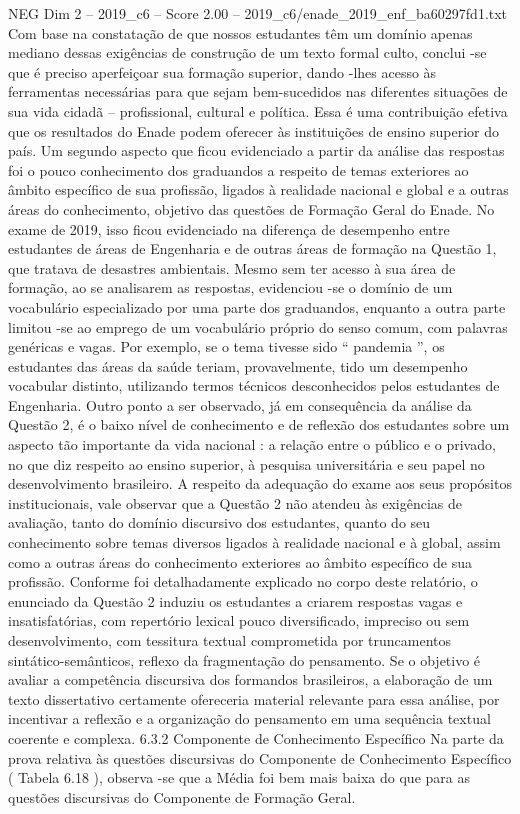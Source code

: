 \begin{textsample}{NEG Dim 2 – 2019\_c6 – Score 2.00 – 2019\_c6/enade\_2019\_enf\_ba60297fd1.txt}
Com base na constatação de que nossos estudantes têm um domínio apenas mediano dessas exigências de construção de um texto formal culto, conclui -se que é preciso aperfeiçoar sua formação superior, dando -lhes acesso às ferramentas necessárias para que sejam bem-sucedidos nas diferentes situações de sua vida cidadã – profissional, cultural e política.
Essa é uma contribuição efetiva que os resultados do Enade podem oferecer às instituições de ensino superior do país.
Um segundo aspecto que ficou evidenciado a partir da análise das respostas foi o pouco conhecimento dos graduandos a respeito de temas exteriores ao âmbito específico de sua profissão, ligados à realidade nacional e global e a outras áreas do conhecimento, objetivo das questões de Formação Geral do Enade.
No exame de 2019, isso ficou evidenciado na diferença de desempenho entre estudantes de áreas de Engenharia e de outras áreas de formação na Questão 1, que tratava de desastres ambientais.
Mesmo sem ter acesso à sua área de formação, ao se analisarem as respostas, evidenciou -se o domínio de um vocabulário especializado por uma parte dos graduandos, enquanto a outra parte limitou -se ao emprego de um vocabulário próprio do senso comum, com palavras genéricas e vagas.
Por exemplo, se o tema tivesse sido “ pandemia ”, os estudantes das áreas da saúde teriam, provavelmente, tido um desempenho vocabular distinto, utilizando termos técnicos desconhecidos pelos estudantes de Engenharia.
Outro ponto a ser observado, já em consequência da análise da Questão 2, é o baixo nível de conhecimento e de reflexão dos estudantes sobre um aspecto tão importante da vida nacional : a relação entre o público e o privado, no que diz respeito ao ensino superior, à pesquisa universitária e seu papel no desenvolvimento brasileiro.
A respeito da adequação do exame aos seus propósitos institucionais, vale observar que a Questão 2 não atendeu às exigências de avaliação, tanto do domínio discursivo dos estudantes, quanto do seu conhecimento sobre temas diversos ligados à realidade nacional e à global, assim como a outras áreas do conhecimento exteriores ao âmbito específico de sua profissão.
Conforme foi detalhadamente explicado no corpo deste relatório, o enunciado da Questão 2 induziu os estudantes a criarem respostas vagas e insatisfatórias, com repertório lexical pouco diversificado, impreciso ou sem desenvolvimento, com tessitura textual comprometida por truncamentos sintático-semânticos, reflexo da fragmentação do pensamento.
Se o objetivo é avaliar a competência discursiva dos formandos brasileiros, a elaboração de um texto dissertativo certamente ofereceria material relevante para essa análise, por incentivar a reflexão e a organização do pensamento em uma sequência textual coerente e complexa. 6.3.2 Componente de Conhecimento Específico Na parte da prova relativa às questões discursivas do Componente de Conhecimento Específico ( Tabela 6.18 ), observa -se que a Média foi bem mais baixa do que para as questões discursivas do Componente de Formação Geral.

\end{textsample}
